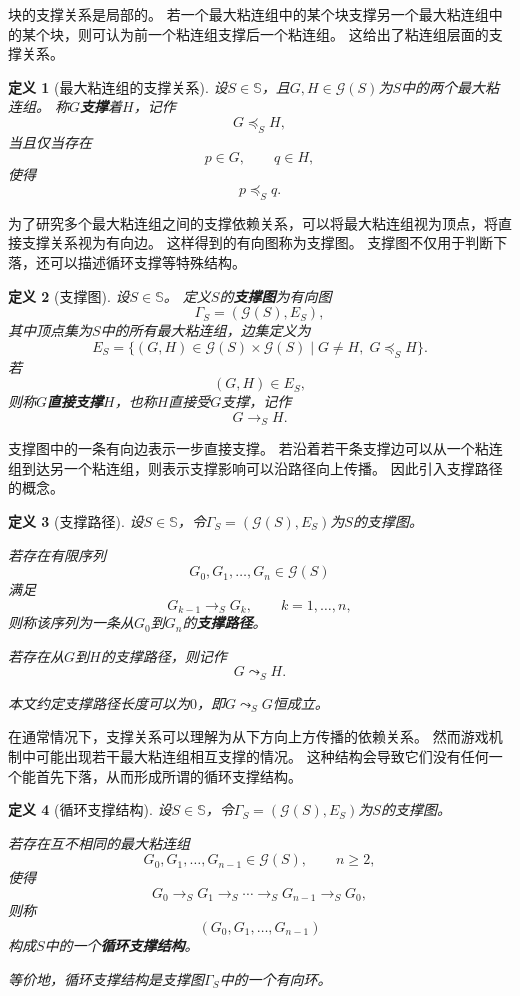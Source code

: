 \documentclass[UTF8,fontset=none]{ctexart}
\theoremstyle{cnthm}
\newtheorem{definition}{定义}[section]
\begin{document}
			块的支撑关系是局部的。
			若一个最大粘连组中的某个块支撑另一个最大粘连组中的某个块，则可认为前一个粘连组支撑后一个粘连组。
			这给出了粘连组层面的支撑关系。
			
			\begin{definition}[最大粘连组的支撑关系]
				设$S\in\mathbb{S}$，且$G,H\in \mathcal{G}(S)$为$S$中的两个最大粘连组。
				称$G$\textbf{支撑}着$H$，记作
				$$
				G\preceq_S H,
				$$
				当且仅当存在
				$$
				p\in G,\qquad q\in H,
				$$
				使得
				$$
				p\preceq_S q.
				$$
			\end{definition}	
			
			为了研究多个最大粘连组之间的支撑依赖关系，可以将最大粘连组视为顶点，将直接支撑关系视为有向边。
			这样得到的有向图称为支撑图。
			支撑图不仅用于判断下落，还可以描述循环支撑等特殊结构。
			
			\begin{definition}[支撑图]
				设$S\in\mathbb{S}$。
				定义$S$的\textbf{支撑图}为有向图
				$$
				\Gamma_S=(\mathcal{G}(S),E_S),
				$$
				其中顶点集为$S$中的所有最大粘连组，边集定义为
				$$
				E_S
				=
				\{(G,H)\in \mathcal{G}(S)\times\mathcal{G}(S)
				\mid G\neq H,\; G\preceq_S H\}.
				$$
				若
				$$
				(G,H)\in E_S,
				$$
				则称$G$\textbf{直接支撑}$H$，也称$H$直接受$G$支撑，记作
				$$
				G\to_S H.
				$$
			\end{definition}
			
			支撑图中的一条有向边表示一步直接支撑。
			若沿着若干条支撑边可以从一个粘连组到达另一个粘连组，则表示支撑影响可以沿路径向上传播。
			因此引入支撑路径的概念。
			
			\begin{definition}[支撑路径]
				设$S\in\mathbb{S}$，令$\Gamma_S=(\mathcal{G}(S),E_S)$为$S$的支撑图。
				
				若存在有限序列
				$$
				G_0,G_1,\dots,G_n\in\mathcal{G}(S)
				$$
				满足
				$$
				G_{k-1}\to_S G_k,
				\qquad k=1,\dots,n,
				$$
				则称该序列为一条从$G_0$到$G_n$的\textbf{支撑路径}。
				
				若存在从$G$到$H$的支撑路径，则记作
				$$
				G\leadsto_S H.
				$$
				
				本文约定支撑路径长度可以为$0$，即$G\leadsto_S G$恒成立。
			\end{definition}
			
			在通常情况下，支撑关系可以理解为从下方向上方传播的依赖关系。
			然而游戏机制中可能出现若干最大粘连组相互支撑的情况。
			这种结构会导致它们没有任何一个能首先下落，从而形成所谓的循环支撑结构。
			
			\begin{definition}[循环支撑结构]
				设$S\in\mathbb{S}$，令$\Gamma_S=(\mathcal{G}(S),E_S)$为$S$的支撑图。
				
				若存在互不相同的最大粘连组
				$$
				G_0,G_1,\dots,G_{n-1}\in\mathcal{G}(S),
				\qquad n\geq 2,
				$$
				使得
				$$
				G_0\to_S G_1\to_S \cdots \to_S G_{n-1}\to_S G_0,
				$$
				则称
				$$
				(G_0,G_1,\dots,G_{n-1})
				$$
				构成$S$中的一个\textbf{循环支撑结构}。
				
				等价地，循环支撑结构是支撑图$\Gamma_S$中的一个有向环。
			\end{definition}
			
\end{document}
